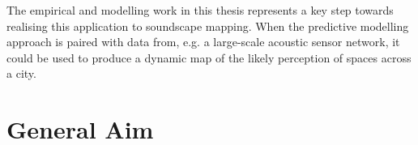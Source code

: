 The empirical and modelling work in this thesis represents a key step towards realising this application to soundscape mapping. When the predictive modelling approach is paired with data from, e.g. a large-scale acoustic sensor network, it could be used to produce a dynamic map of the likely perception of spaces across a city. 



\section{General Aim}
